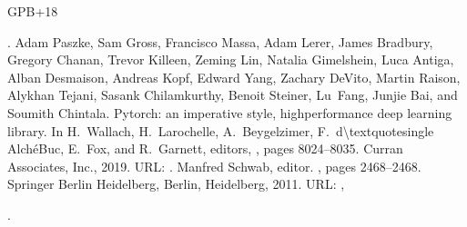 \documentclass[letterpaper,10pt,english,openany,oneside]{sphinxmanual}
\begin{document}
\begin{sphinxthebibliography}{GPB+18}
\begin{footnote}[10]\sphinxAtStartFootnote
{}
%
\end{footnote}.
Adam Paszke, Sam Gross, Francisco Massa, Adam Lerer, James Bradbury, Gregory Chanan, Trevor Killeen, Zeming Lin, Natalia Gimelshein, Luca Antiga, Alban Desmaison, Andreas Kopf, Edward Yang, Zachary DeVito, Martin Raison, Alykhan Tejani, Sasank Chilamkurthy, Benoit Steiner, Lu Fang, Junjie Bai, and Soumith Chintala. Pytorch: an imperative style, high\sphinxhyphen{}performance deep learning library. In H. Wallach, H. Larochelle, A. Beygelzimer, F. d\textbackslash{}textquotesingle  Alché\sphinxhyphen{}Buc, E. Fox, and R. Garnett, editors, , pages 8024–8035. Curran Associates, Inc., 2019. URL: .
Manfred Schwab, editor. , pages 2468–2468. Springer Berlin Heidelberg, Berlin, Heidelberg, 2011. URL: , %
\begin{footnote}[11]\sphinxAtStartFootnote
{}
%
\end{footnote}.
\end{sphinxthebibliography}


\renewcommand{\indexname}{Python Module Index}
\begin{sphinxtheindex}
\let\bigletter\sphinxstyleindexlettergroup
\bigletter{d}
\item\relax{}
\end{sphinxtheindex}

\renewcommand{\indexname}{Index}
\footnotesize\raggedright\printindex
\end{document}
